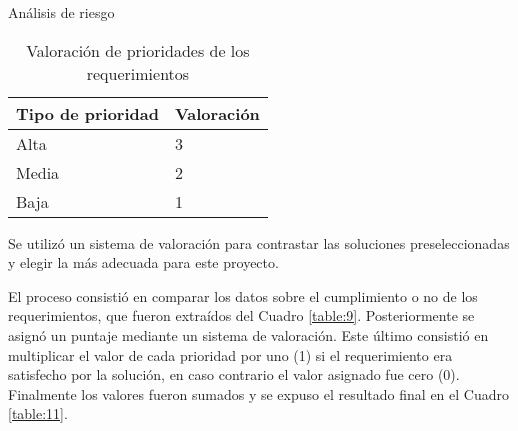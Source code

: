 \begin{section}{Análisis de riesgo}
\begin{table}[H]
\begin{tabular}{|m{16em}|m{7em}|}
            \hline 
                Tipo de prioridad  & Valoración \\ 
            \hline
                Alta & 3 \\ 
            \hline
                Media  & 2 \\ 
            \hline
                Baja & 1 \\
            \hline %
        \end{tabular}
        \caption{Valoración de prioridades de los requerimientos}
        \label{table:10}
    \end{table}
     \FloatBarrier
    Se utilizó un sistema de valoración para contrastar las soluciones preseleccionadas y elegir la más adecuada para este proyecto. \par
    El proceso consistió en comparar  los datos sobre el cumplimiento o no de los requerimientos, que fueron extraídos del Cuadro \ref{table:9}. Posteriormente se asignó un puntaje mediante un sistema de valoración. Este último consistió en multiplicar el valor de cada prioridad por uno (1) si el requerimiento era satisfecho por la solución, en caso contrario el valor asignado fue cero (0). Finalmente los valores fueron sumados y se expuso el resultado final en el Cuadro \ref{table:11}.
    \begin{table}[H]
        \centering
        \begin{tabular}{|m{4em}|m{2em}|m{2em}|m{2em}|m{2em}|m{2em}|m{2em}|m{3em}|m{3em}|m{3em}|m{3em}| m{2em}|}
        

\end{tabular}
\end{table}
\end{section}
